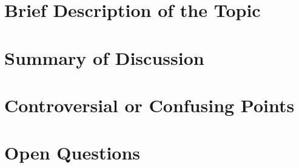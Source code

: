 \documentclass[11pt]{article}
\title{$TITLE}
\author{TLA+ Study Group}
\date{\today}
\begin{document}
\maketitle

\section*{Brief Description of the Topic}

\section*{Summary of Discussion}

\section*{Controversial or Confusing Points}

\section*{Open Questions}
\end{document}
